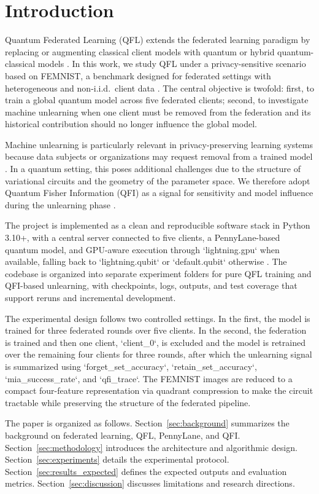 \section{Introduction}

Quantum Federated Learning (QFL) extends the federated learning paradigm by replacing or augmenting classical client models with quantum or hybrid quantum-classical models \cite{fedavg,kairouz2019,qfl_towards_2023,qfl_foundations_2023}. In this work, we study QFL under a privacy-sensitive scenario based on FEMNIST, a benchmark designed for federated settings with heterogeneous and non-i.i.d.\ client data \cite{leaf}. The central objective is twofold: first, to train a global quantum model across five federated clients; second, to investigate machine unlearning when one client must be removed from the federation and its historical contribution should no longer influence the global model.

Machine unlearning is particularly relevant in privacy-preserving learning systems because data subjects or organizations may request removal from a trained model \cite{unlearning_survey_2024}. In a quantum setting, this poses additional challenges due to the structure of variational circuits and the geometry of the parameter space. We therefore adopt Quantum Fisher Information (QFI) as a signal for sensitivity and model influence during the unlearning phase \cite{qfi,federated_unlearning_active_forgetting,forgettable_federated_linear_learning}.

The project is implemented as a clean and reproducible software stack in Python 3.10+, with a central server connected to five clients, a PennyLane-based quantum model, and GPU-aware execution through `lightning.gpu` when available, falling back to `lightning.qubit` or `default.qubit` otherwise \cite{pennylane,lightning2024}. The codebase is organized into separate experiment folders for pure QFL training and QFI-based unlearning, with checkpoints, logs, outputs, and test coverage that support reruns and incremental development.

The experimental design follows two controlled settings. In the first, the model is trained for three federated rounds over five clients. In the second, the federation is trained and then one client, `client_0`, is excluded and the model is retrained over the remaining four clients for three rounds, after which the unlearning signal is summarized using `forget_set_accuracy`, `retain_set_accuracy`, `mia_success_rate`, and `qfi_trace`. The FEMNIST images are reduced to a compact four-feature representation via quadrant compression to make the circuit tractable while preserving the structure of the federated pipeline.

The paper is organized as follows. Section~\ref{sec:background} summarizes the background on federated learning, QFL, PennyLane, and QFI. Section~\ref{sec:methodology} introduces the architecture and algorithmic design. Section~\ref{sec:experiments} details the experimental protocol. Section~\ref{sec:results_expected} defines the expected outputs and evaluation metrics. Section~\ref{sec:discussion} discusses limitations and research directions.
